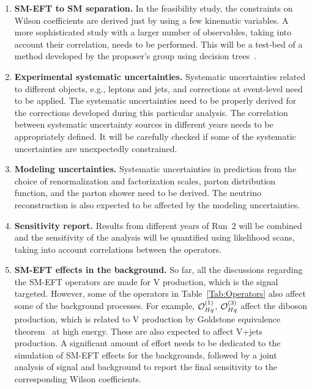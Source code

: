 \documentclass[a4paper,11pt]{article}
\renewcommand{\PV}{{{{V}}}\xspace}
\newcommand{\VH}{{{\PV}{\PH}}\xspace}
\begin{document}
\begin{enumerate}[noitemsep,topsep=0pt]
\item {\bf SM-EFT to SM separation.} In the feasibility study, the constraints on Wilson coefficients are derived just by using a few kinematic variables.
A more sophisticated study with a larger number of observables, taking into account their correlation, needs to be performed. 
This will be a test-bed of a method developed by the proposer's group using decision trees~\cite{Chatterjee:2021nms}. 

\item {\bf Experimental systematic uncertainties.} Systematic uncertainties related to different objects, e.g., leptons and jets, and corrections at event-level need to be applied. 
The systematic uncertainties need to be properly derived for the corrections developed during this particular analysis. 
The correlation between systematic uncertainty sources in different years needs to be appropriately defined. 
It will be carefully checked if some of the systematic uncertainties are unexpectedly constrained. 

\item {\bf Modeling uncertainties.} Systematic uncertainties in prediction from the choice of renormalization and factorization scales,  parton distribution function,  and the parton shower need to be derived. 
The neutrino reconstruction is also expected to be affected by the modeling uncertainties. 

\item {\bf Sensitivity report.} Results from different years of Run~2 will be combined and
the sensitivity of the analysis will be quantified using likelihood scans, taking into account correlations between the operators. 

\item {\bf SM-EFT effects in the background.} So far, all the discussions regarding the SM-EFT operators are made for \VH production, which is the signal targeted. However, some of the operators in Table~\ref{Tab:Operators} also affect some of the background processes. 
For example, ${\cal O}^{(1)}_{Hq}$, ${\cal O}^{(3)}_{Hq}$ affect the diboson production, which is related to \VH production by Goldstone equivalence theorem~\cite{PhysRevD.10.1145} at high energy. 
These are also expected to affect {\PV}+jets production. 
A significant amount of effort needs to be dedicated to the simulation of SM-EFT effects for the backgrounds, followed by a joint analysis of signal and background to report the final sensitivity to the corresponding Wilson coefficients. 


\end{enumerate}
\end{document}
